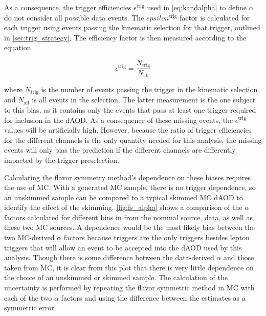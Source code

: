 As a consequence, the trigger efficiencies $\epsilon^\text{trig}$ used in \autoref{eq:kandalpha} to define $\alpha$ do not consider all possible data events. The $epsilon^\text{trig}$ factor is calculated for each trigger using events passing the kinematic selection for that trigger, outlined in \autoref{sec:trig_strategy}. The efficiency factor is then measured according to the equation

\begin{equation}
\epsilon^\text{trig} = \frac{N_\text{trig}}{N_\text{all}} 
\end{equation}

where $N_\text{trig}$ is the number of events passing the trigger in the kinematic selection and $N_\text{all}$ is all events in the selection. The latter measurement is the one subject to this bias, as it contains only the events that pass at least one trigger required for inclusion in the \ac{dAOD}. As a consequence of these missing events, the $\epsilon^\text{trig}$ values will be artificially high. However, because the ratio of trigger efficiencies for the different channels is the only quantity needed for this analysis, the missing events will only bias the prediction if the different channels are differently impacted by the trigger preselection.

Calculating the flavor symmetry method's dependence on these biases requires the use of \ac{MC}. With a generated \ac{MC} sample, there is no trigger dependence, so an unskimmed sample can be compared to a typical skimmed \ac{MC} \ac{dAOD} to identify the effect of the skimming. \autoref{fig:fs_alpha} shows a comparison of the $\alpha$ factors calculated for different bins in \met from the nominal source, data, as well as these two \ac{MC} sources. A \met dependence would be the most likely bias between the two \ac{MC}-derived $\alpha$ factors because \met triggers are the only triggers besides lepton triggers that will allow an event to be accepted into the dAOD used by this analysis. Though there is some difference between the data-derived $\alpha$ and those taken from \ac{MC}, it is clear from this plot that there is very little dependence on the choice of an unskimmed or skimmed sample. The calculation of the uncertainty is performed by repeating the flavor symmetric method in \ac{MC} with each of the two $\alpha$ factors and using the difference between the estimates as a symmetric error.

